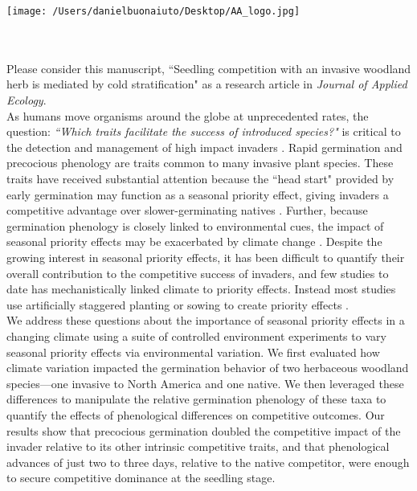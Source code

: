 \documentclass[11.5 pt]{article}
\begin{document}


\def\labelitemi{--}
\parindent=24pt
\noindent\texttt{[image: /Users/danielbuonaiuto/Desktop/AA\_logo.jpg]}
\\\\
\\
\vspace{1.5ex}

\noindent Please consider this manuscript, ``Seedling competition with an invasive woodland herb is mediated by cold stratification" as a research article in \textit{Journal of Applied Ecology}.\\

\noindent As humans move organisms around the globe at unprecedented rates, the question:  \textit{``Which traits facilitate the success of introduced species?"} is critical to the detection and management of high impact invaders \citep{Fournier2019}. 
Rapid germination and precocious phenology are traits common to many invasive plant species. These traits have received substantial attention because the ``head start" provided by early germination may function as a seasonal priority effect, giving invaders a competitive advantage over slower-germinating natives \citep{Wainwright_2011}. Further, because germination phenology is closely linked to environmental cues, the impact of seasonal priority effects may be exacerbated by climate change \citep{Rudolf:2019aa}. Despite the growing interest in seasonal priority effects, it has been difficult to quantify their overall contribution to the competitive success of invaders, and few studies to date has mechanistically linked climate to priority effects. Instead most studies use artificially staggered planting or sowing to create priority effects \citep{Young:2017aa}.\\

\noindent We address these questions about the importance of seasonal priority effects in a changing climate using a suite of controlled environment experiments to vary seasonal priority effects via environmental variation. We first evaluated how climate variation impacted the germination behavior of two herbaceous woodland species---one invasive to North America and one native. We then leveraged these differences to manipulate the relative germination phenology of these taxa to quantify the effects of phenological differences on competitive outcomes. Our results show that precocious germination doubled the competitive impact of the invader relative to its other intrinsic competitive traits, and that phenological advances of just two to three days, relative to the native competitor, were enough to secure competitive dominance at the seedling stage.\\
\end{document}
